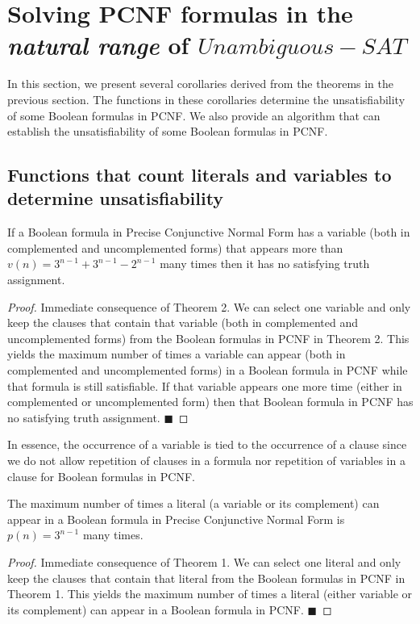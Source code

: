 \documentclass[runningheads,a4paper]{llncs}
\begin{document}
\section{Solving PCNF formulas in the \emph{natural range} of ${Unambiguous-SAT}$} 

In this section, we present several corollaries derived from the theorems in the previous section. The functions in these corollaries determine the unsatisfiability of some Boolean formulas in PCNF. We also provide an algorithm that can establish the unsatisfiability of some Boolean formulas in PCNF. 

\subsection{Functions that count literals and variables to determine unsatisfiability}
\begin{corollary}\normalfont
If a Boolean formula in Precise Conjunctive Normal Form has a variable (both in complemented and uncomplemented forms) that appears more than $v(n) = 3^{n-1}+3^{n-1}-2^{n-1}$ many times then it has no satisfying truth assignment.

\begin{proof}\normalfont
Immediate consequence of Theorem 2. We can select one variable and only keep the clauses that contain that variable (both in complemented and uncomplemented forms) from the Boolean formulas in PCNF in Theorem 2. This yields the maximum number of times a variable can appear (both in complemented and uncomplemented forms) in a Boolean formula in PCNF while that formula is still satisfiable. If that variable appears one more time (either in complemented or uncomplemented form) then that Boolean formula in PCNF has no satisfying truth assignment. $\blacksquare$

\end{proof}
\end{corollary}

In essence, the occurrence of a variable is tied to the occurrence of a clause since we do not allow repetition of clauses in a formula nor repetition of variables in a clause for Boolean formulas in PCNF.

\newpage

\begin{corollary}\normalfont
The maximum number of times a literal (a variable or its complement) can appear in a Boolean formula in Precise Conjunctive Normal Form is  $p(n) = 3^{n-1}$ many times. 
\begin{proof}\normalfont
Immediate consequence of Theorem 1. We can select one literal and only keep the clauses that contain that literal from the Boolean formulas in PCNF in Theorem 1. This yields the maximum number of times a literal (either variable or its complement) can appear in a Boolean formula in PCNF. $\blacksquare$
\end{proof}
\end{corollary}
\end{document}
